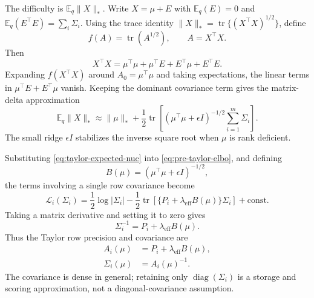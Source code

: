 \documentclass[11pt]{article}
\begin{document}
The difficulty is $\mathbb{E}_q\|X\|_*$.  Write
$X=\mu+E$ with $\mathbb{E}_q(E)=0$ and
$\mathbb{E}_q(E^\top E)=\sum_i\Sigma_i$.  Using the trace identity
$\|X\|_*=\operatorname{tr}\{(X^\top X)^{1/2}\}$, define
\begin{equation}
    f(A)=\operatorname{tr}(A^{1/2}),
    \qquad
    A=X^\top X.
\end{equation}
Then
\begin{equation}
    X^\top X
    =
    \mu^\top\mu
    +
    \mu^\top E
    +
    E^\top\mu
    +
    E^\top E.
\end{equation}
Expanding $f(X^\top X)$ around $A_0=\mu^\top\mu$ and taking expectations, the
linear terms in $\mu^\top E+E^\top\mu$ vanish.  Keeping the dominant covariance
term gives the matrix-delta approximation
\begin{equation}
    \mathbb{E}_q\|X\|_*
    \approx
    \|\mu\|_*
    +
    \frac{1}{2}
    \operatorname{tr}
    \left[
        (\mu^\top\mu+\epsilon I)^{-1/2}
        \sum_{i=1}^m \Sigma_i
    \right].
    \label{eq:taylor-expected-nuc}
\end{equation}
The small ridge $\epsilon I$ stabilizes the inverse square root when $\mu$ is
rank deficient.

Substituting \eqref{eq:taylor-expected-nuc} into
\eqref{eq:pre-taylor-elbo}, and defining
\begin{equation}
    B(\mu)
    =
    (\mu^\top\mu+\epsilon I)^{-1/2},
\end{equation}
the terms involving a single row covariance become
\begin{equation}
    \mathcal{L}_i(\Sigma_i)
    =
    \frac{1}{2}\log|\Sigma_i|
    -
    \frac{1}{2}
    \operatorname{tr}
    \left[
        \{P_i+\lambda_{\mathrm{eff}}B(\mu)\}\Sigma_i
    \right]
    +
    \mathrm{const}.
\end{equation}
Taking a matrix derivative and setting it to zero gives
\begin{equation}
    \Sigma_i^{-1}
    =
    P_i+\lambda_{\mathrm{eff}}B(\mu).
\end{equation}
Thus the Taylor row precision and covariance are
\begin{align}
    A_i(\mu)
        &=
        P_i+\lambda_{\mathrm{eff}}B(\mu), \label{eq:taylor-row-precision}\\
    \Sigma_i(\mu)
        &=
        A_i(\mu)^{-1}.
\end{align}
The covariance is dense in general; retaining only $\operatorname{diag}(\Sigma_i)$
is a storage and scoring approximation, not a diagonal-covariance assumption.
\end{document}
